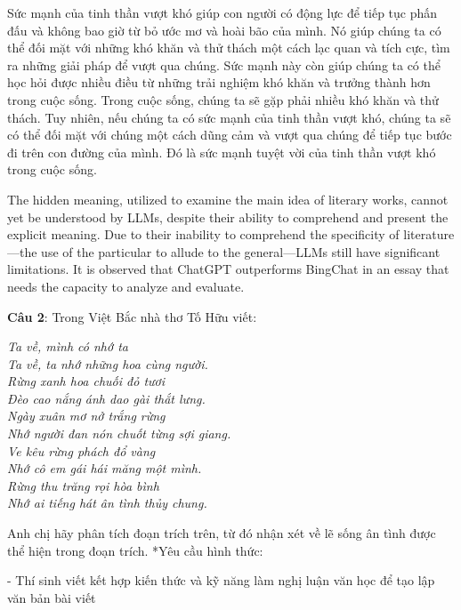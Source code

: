 \documentclass{article}
\begin{document}
{\begin{mdframed}[linewidth=1pt,linecolor=red]
		Sức mạnh của tinh thần vượt khó giúp con người có động lực để tiếp tục phấn đấu và không bao giờ từ bỏ ước mơ và hoài bão của mình. Nó giúp chúng ta có thể đối mặt với những khó khăn và thử thách một cách lạc quan và tích cực, tìm ra những giải pháp để vượt qua chúng. Sức mạnh này còn giúp chúng ta có thể học hỏi được nhiều điều từ những trải nghiệm khó khăn và trưởng thành hơn trong cuộc sống.
		Trong cuộc sống, chúng ta sẽ gặp phải nhiều khó khăn và thử thách. Tuy nhiên, nếu chúng ta có sức mạnh của tinh thần vượt khó, chúng ta sẽ có thể đối mặt với chúng một cách dũng cảm và vượt qua chúng để tiếp tục bước đi trên con đường của mình. Đó là sức mạnh tuyệt vời của tinh thần vượt khó trong cuộc sống.
		
	\end{mdframed}
	
	The hidden meaning, utilized to examine the main idea of literary works, cannot yet be understood by LLMs, despite their ability to comprehend and present the explicit meaning. Due to their inability to comprehend the specificity of literature—the use of the particular to allude to the general—LLMs still have significant limitations. It is observed that ChatGPT outperforms BingChat in an essay that needs the capacity to analyze and evaluate.
	
	
	\begin{mdframed}[linewidth=1pt,linecolor=red]	
		\textbf{Câu 2}: Trong Việt Bắc nhà thơ Tố Hữu viết:
\begin{multicols}{2}
\emph{
				Ta về, mình có nhớ ta \\
				Ta về, ta nhớ những hoa cùng người. \\
				Rừng xanh hoa chuối đỏ tươi \\
				Đèo cao nắng ánh dao gài thắt lưng. \\
				Ngày xuân mơ nở trắng rừng \\
				Nhớ người đan nón chuốt từng sợi giang. \\
				Ve kêu rừng phách đổ vàng \\
				Nhớ cô em gái hái măng một mình. \\
				Rừng thu trăng rọi hòa bình \\
				Nhớ ai tiếng hát ân tình thủy chung. \\
			}
\end{multicols}
Anh chị hãy phân tích đoạn trích trên, từ đó nhận xét về lẽ sống ân tình được thể hiện trong đoạn trích.
		*Yêu cầu hình thức:
		
		- Thí sinh viết kết hợp kiến thức và kỹ năng làm nghị luận văn học để tạo lập văn bản bài viết
		

\end{mdframed}}
\end{document}
